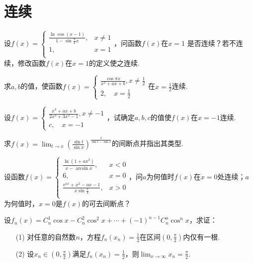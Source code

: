 \section{连续}
\begin{xiti}
	\item 设$f\left(x\right)=\left\{\begin{matrix}
	\frac{\ln\cos\left(x-1\right)}{1-\sin\frac{\pi}{2}x},&		x\ne 1\\
	1,&		x=1\\
	\end{matrix}\right. $，问函数$f(x)$在$x=1$
	是否连续？若不连续，修改函数$f(x)$在$x=1$的定义使之连续.
	\item 求$a,b$的值，使函数$f ( x ) = \left\{ \begin{array} { l } { \frac { \cos \pi x } { x ^ { 2 } + a x + b } , x \neq \frac { 1 } { 2 } } \\ { 2 , \quad x = \frac { 1 } { 2 } } \end{array} \right.$在$x=\frac{1}{2}$连续.
	\item 设$f ( x ) = \left\{ \begin{array} { c } { \frac { x ^ { 3 } + a x + b } { 2 x ^ { 3 } + 3 x ^ { 2 } - 1 } , x \neq - 1 } \\ { c , \quad x = - 1 } \end{array} \right.$，试确定$a,b,c$的值使$f(x)$在$x=-1$连续.
	\item 求$f ( x ) = \lim _ { t \rightarrow x } \left( \frac { \sin t } { \sin x } \right) ^ { \frac { x } { \sin t - \sin x } }$的间断点并指出其类型.
	\item 设函数$f\left(x\right)=\left\{\begin{matrix}
	\frac{\ln\left(1+ax^3\right)}{x-\arcsin x},&		x<0\\
	6,&		x=0\\
	\frac{\textrm{e}^{ax}+x^2-ax-1}{x\sin\frac{x}{4}},&		x>0\\
	\end{matrix}\right. $，问$a$为何值时$f(x)$在$x=0$处连续；$a$为何值时，$x=0$是$f(x)$的可去间断点？
	\item 设$f_n\left(x\right)=C_{n}^{1}\cos x-C_{n}^{2}\cos^2x+\cdots +\left(-1\right)^{n-1}C_{n}^{n}\cos^nx$，求证：
	\begin{enumerate}
		\item [(1)] 对任意的自然数$n$，方程$f _ { n } \left( x _ { n } \right) = \frac { 1 } { 2 }$在区间$(0,\frac{\pi }{2})$内仅有一根.
		\item [(2)] 设$x _ { n } \in \left( 0 , \frac { \pi } { 2 } \right)$满足$f _ { n } \left( x _ { n } \right) = \frac { 1 } { 2 }$，则$\lim _ { x \rightarrow \infty } x _ { n } = \frac { \pi } { 2 }$.

\end{enumerate}
\end{xiti}
